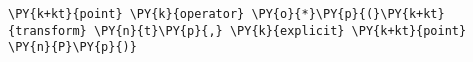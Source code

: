 \begin{Verbatim}[commandchars=\\\{\}]
    \PY{k+kt}{point} \PY{k}{operator} \PY{o}{*}\PY{p}{(}\PY{k+kt}{transform} \PY{n}{t}\PY{p}{,} \PY{k}{explicit} \PY{k+kt}{point} \PY{n}{P}\PY{p}{)}
\end{Verbatim}

